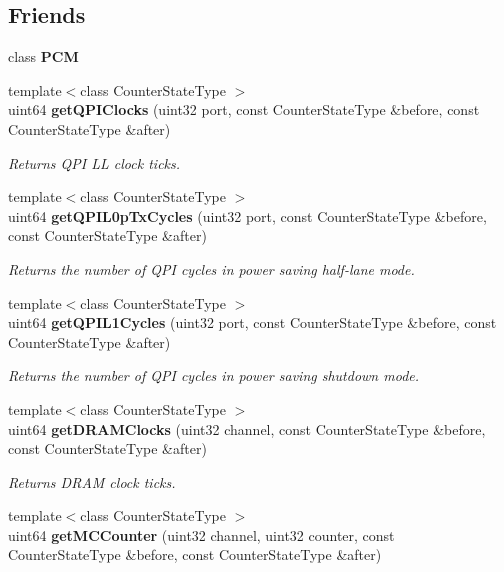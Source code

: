 \subsection*{Friends}
\begin{DoxyCompactItemize}
\item 
class {\bfseries P\+C\+M}\label{classServerUncorePowerState_ab5f56d2e95ba3daf52c17b8a1d356d64}

\item 
{\footnotesize template$<$class Counter\+State\+Type $>$ }\\uint64 {\bf get\+Q\+P\+I\+Clocks} (uint32 port, const Counter\+State\+Type \&before, const Counter\+State\+Type \&after)
\begin{DoxyCompactList}\small\item\em Returns Q\+P\+I L\+L clock ticks. \end{DoxyCompactList}\item 
{\footnotesize template$<$class Counter\+State\+Type $>$ }\\uint64 {\bf get\+Q\+P\+I\+L0p\+Tx\+Cycles} (uint32 port, const Counter\+State\+Type \&before, const Counter\+State\+Type \&after)
\begin{DoxyCompactList}\small\item\em Returns the number of Q\+P\+I cycles in power saving half-\/lane mode. \end{DoxyCompactList}\item 
{\footnotesize template$<$class Counter\+State\+Type $>$ }\\uint64 {\bf get\+Q\+P\+I\+L1\+Cycles} (uint32 port, const Counter\+State\+Type \&before, const Counter\+State\+Type \&after)
\begin{DoxyCompactList}\small\item\em Returns the number of Q\+P\+I cycles in power saving shutdown mode. \end{DoxyCompactList}\item 
{\footnotesize template$<$class Counter\+State\+Type $>$ }\\uint64 {\bf get\+D\+R\+A\+M\+Clocks} (uint32 channel, const Counter\+State\+Type \&before, const Counter\+State\+Type \&after)
\begin{DoxyCompactList}\small\item\em Returns D\+R\+A\+M clock ticks. \end{DoxyCompactList}\item 
{\footnotesize template$<$class Counter\+State\+Type $>$ }\\uint64 {\bf get\+M\+C\+Counter} (uint32 channel, uint32 counter, const Counter\+State\+Type \&before, const Counter\+State\+Type \&after)

\end{DoxyCompactItemize}
